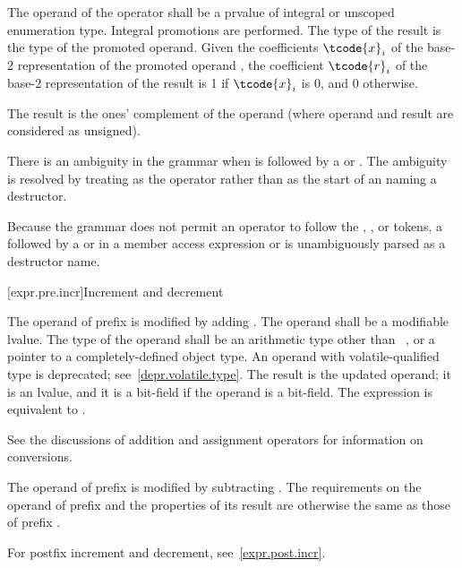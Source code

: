 \pnum
{}%
The operand of the \tcode{\~{}} operator shall be a prvalue of
integral or unscoped enumeration type.
Integral promotions are performed.
The type of the result is the type of the promoted operand.
Given the coefficients $\tcode{x}_i$
of the base-2 representation
of the promoted operand ,
the coefficient $\tcode{r}_i$
of the base-2 representation of the result 
is 1 if $\tcode{x}_i$ is 0, and 0 otherwise.
\begin{note}
The result is the ones' complement of the operand
(where operand and result are considered as unsigned).
\end{note}
There is an ambiguity
in the grammar when \tcode{\~{}} is followed by
a  or .
The ambiguity is resolved by treating \tcode{\~{}} as the
operator rather than as the start of an 
naming a destructor.
\begin{note}
Because the grammar does not permit an operator to follow the
, \tcode{->}, or \tcode{::} tokens, a \tcode{\~{}} followed by
a  or  in a
member access expression or  is
unambiguously parsed as a destructor name.
\end{note}

[expr.pre.incr]{Increment and decrement}

\pnum
{}%
%
The operand of prefix \tcode{++}
%
%
is modified by adding .
%
The operand shall be a modifiable lvalue. The type of the operand shall
be an arithmetic type other than \cv{}~,
or a pointer to a completely-defined object type.
An operand with volatile-qualified type is deprecated;
see~\ref{depr.volatile.type}.
The result is the updated operand; it is an lvalue, and it is a
bit-field if the operand is a bit-field.
The expression  is equivalent to .
%
\begin{note}
See the discussions of addition and assignment
operators for information on conversions.
\end{note}

\pnum
The operand of prefix
%
\tcode{--} is modified by subtracting .
The requirements on the operand of prefix
\tcode{--} and the properties of its result are otherwise the same as
those of prefix \tcode{++}.
\begin{note}
For postfix increment and decrement, see~\ref{expr.post.incr}.
\end{note}

